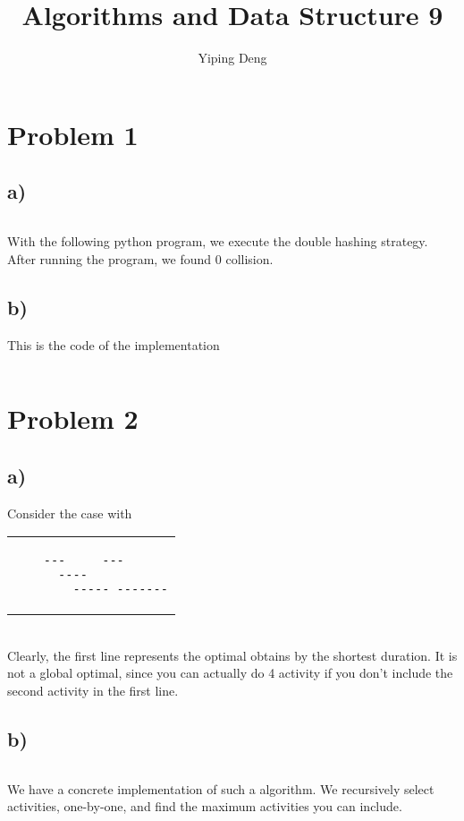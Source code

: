\documentclass{article}
\newcommand{\hwnumber}{9}
\begin{document}
\title{Algorithms and Data Structure \hwnumber}
\author{Yiping Deng}
\maketitle
\thispagestyle{fancy}
\section*{Problem 1}
\subsection*{a)}
\inputminted{python}{1a.py}
With the following python program, we execute the double hashing strategy.
After running the program, we found 0 collision.
\subsection*{b)}
This is the code of the implementation
\inputminted{python}{1b.py}
\section*{Problem 2}
\subsection*{a)}
Consider the case with \\
\begin{tabular}{|p{10cm}|}
    \begin{verbatim}
    ---     ---
      ----
        ----- -------
    \end{verbatim}
\end{tabular} \\
Clearly, the first line represents the optimal obtains by the shortest duration.
It is not a global optimal, since you can actually do 4 activity if you
don't include the second activity in the first line.
\subsection*{b)}
\inputminted{python}{2b.py}
We have a concrete implementation of such a algorithm.
We recursively select activities, one-by-one, and find the maximum
activities you can include.
\end{document}
